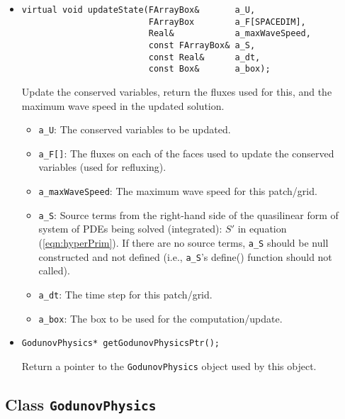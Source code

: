 \begin{itemize}
\item \begin{small}\begin{verbatim}
virtual void updateState(FArrayBox&       a_U,
                         FArrayBox        a_F[SPACEDIM],
                         Real&            a_maxWaveSpeed,
                         const FArrayBox& a_S,
                         const Real&      a_dt,
                         const Box&       a_box);
\end{verbatim}\end{small}
Update the conserved variables, return the fluxes used for this, and
the maximum wave speed in the updated solution.
\begin{itemize}
\item \verb/a_U/:  The conserved variables to be updated.
\vspace{-0.07in}
\item \verb/a_F[]/:  The fluxes on each of the faces used to update the
conserved variables (used for refluxing).
\vspace{-0.07in}
\item \verb/a_maxWaveSpeed/:  The maximum wave speed for this patch/grid.
\vspace{-0.07in}
\item \verb/a_S/:  Source terms from the right-hand side of the quasilinear form of system
of PDEs being solved (integrated): $S'$ in equation (\ref{eqn:hyperPrim}).
If there are no source terms, \verb/a_S/ should be null constructed and not
defined (i.e., \verb/a_S/'s define() function should not called).
\vspace{-0.07in}
\item \verb/a_dt/:  The time step for this patch/grid.
\vspace{-0.07in}
\item \verb/a_box/:  The box to be used for the computation/update.
\end{itemize}

\item \begin{small} \begin{verbatim}
GodunovPhysics* getGodunovPhysicsPtr();
\end{verbatim}\end{small}
Return a pointer to the \verb/GodunovPhysics/ object used by this object.

\end{itemize}


\subsection{Class {\tt GodunovPhysics}} 

